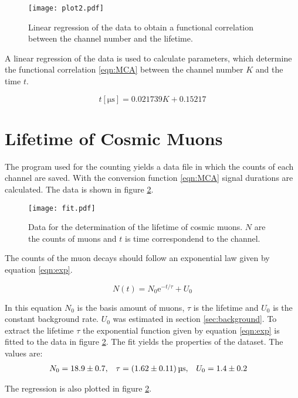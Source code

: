 \begin{figure}
    \centering
    \texttt{[image: plot2.pdf]}
    \caption{Linear regression\cite{scipy} of the data to obtain a functional correlation between the channel number and the lifetime.}
    \label{fig:MCA}
\end{figure}

A linear regression of the data is used to calculate parameters, which determine the functional correlation \ref{eqn:MCA} between the channel number $K$ and the time $t$.

\begin{equation}
    \label{eqn:MCA}
    t[\unit{\micro\second}] = 0.021739K +  0.15217
\end{equation}

\section{Lifetime of Cosmic Muons}
\label{sec:lifetime}

The program used for the counting yields a data file in which the counts of each channel are saved. With the conversion function \ref{eqn:MCA} signal durations are calculated. The data 
is shown in figure \ref{fig:lifetime}.

\begin{figure}
    \centering
    \texttt{[image: fit.pdf]}
    \caption{Data for the determination of the lifetime of cosmic muons. $N$ are the counts of muons and $t$ is time correspondend to the channel.}
    \label{fig:lifetime}
\end{figure}

The counts of the muon decays should follow an exponential law given by equation \ref{eqn:exp}. 

\begin{equation}
    \label{eqn:exp}
    N(t) = N_0 \mathrm{e}^{-t/\tau} + U_0
\end{equation}

In this equation $N_0$ is the basis amount of muons, $\tau$ is the lifetime and $U_0$ is the constant background rate. $U_0$ was estimated in section \ref{sec:background}.
To extract the lifetime $\tau$ the exponential function given by equation \ref{eqn:exp} is fitted to the data in figure \ref{fig:lifetime}.
The fit yields the properties of the dataset. The values are:
\begin{align*}
    N_0 &= \num{18.9 +- 0.7}, & \tau &= \qty{1.62 +- 0.11}{\micro\second}, & U_0 &= \num{1.4 +- 0.2}
\end{align*}

The regression is also plotted in figure \ref{fig:lifetime}.